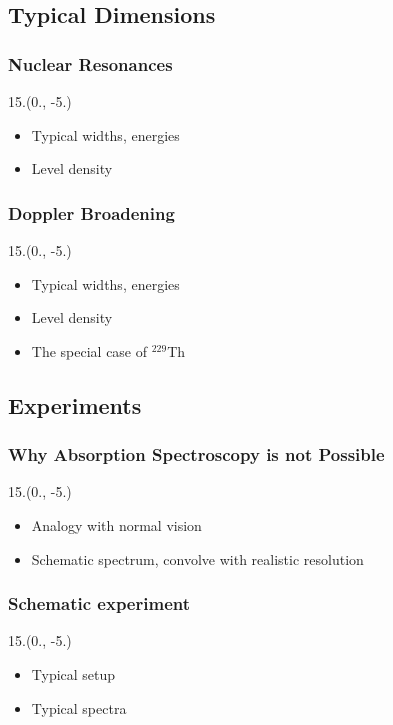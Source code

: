 \documentclass{beamer}
\begin{document}
\subsection{Typical Dimensions}

\begin{frame}
    \frametitle{Nuclear Resonances}
    \begin{textblock}{15.}(0., -5.)
        \begin{itemize}
            \item Typical widths, energies
            \item Level density
        \end{itemize}
    \end{textblock}
\end{frame}

\begin{frame}
    \frametitle{Doppler Broadening}
    \begin{textblock}{15.}(0., -5.)
        \begin{itemize}
            \item Typical widths, energies
            \item Level density
            \item The special case of $^{229}$Th
        \end{itemize}
    \end{textblock}
\end{frame}

\subsection{Experiments}

\begin{frame}
    \frametitle{Why Absorption Spectroscopy is not Possible}
    \begin{textblock}{15.}(0., -5.)
        \begin{itemize}
            \item Analogy with normal vision
            \item Schematic spectrum, convolve with realistic resolution
        \end{itemize}
    \end{textblock}
\end{frame}

\begin{frame}
    \frametitle{Schematic experiment}
    \begin{textblock}{15.}(0., -5.)
        \begin{itemize}
            \item Typical setup
            \item Typical spectra
        \end{itemize}
    \end{textblock}
\end{frame}
\end{document}
